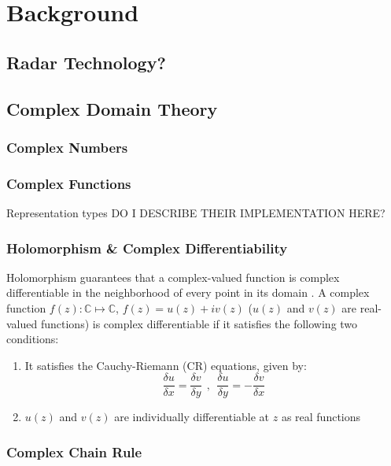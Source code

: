 \chapter{Background}\label{chap:comp}
\section{Radar Technology?}


\section{Complex Domain Theory}

\subsection{Complex Numbers}
\subsection{Complex Functions}




Representation types
DO I DESCRIBE THEIR IMPLEMENTATION HERE?

\subsection{Holomorphism \& Complex Differentiability}

Holomorphism guarantees that a complex-valued function is complex differentiable in the neighborhood of every point in its domain \cite{trabelsi2018deep}.
A complex function $f(z): \mathbb{C} \mapsto \mathbb{C}$, $f(z)= u(z) + iv(z)$ ($u(z)$ and $v(z)$ are real-valued functions) is complex differentiable if it satisfies the following two conditions:
\begin{enumerate}

	\item It satisfies the Cauchy-Riemann (CR) equations, given by:
\begin{equation}\label{eq:compdiff}
\frac{\delta u}{\delta x} = \frac{\delta v}{\delta y} ~~,~~ \frac{\delta u}{\delta y} = - \frac{\delta v}{\delta x} 
\end{equation}
	\item $u(z)$ and $v(z)$ are individually differentiable at $z$ as real functions	
\end{enumerate} 


 
\subsection{Complex Chain Rule}\label{cchainrule}




